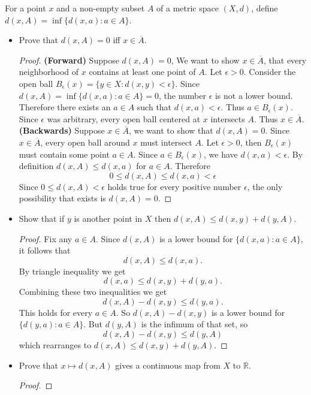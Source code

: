 \documentclass[minion]{homework}
\newcommand{\Reals}{\ensuremath{\mathbb R}}%
\begin{document}
\begin{problems}
For a point $x$ and a non-empty subset $A$ of a metric space $(X, d)$, define $d(x, A) = \inf\{d(x, a) : a \in A\}$.
\begin{itemize}
  \item[(a)] Prove that $d(x, A) = 0$ iff $x \in \overline{A}$. \newline
    \begin{proof}\textbf{(Forward)}
      Suppose $d(x,A) = 0$, We want to show $x \in \overline{A}$, that every neighborhood of $x$ contains at least one point of $A$.
      Let $\epsilon > 0$. Consider the open ball $B_\epsilon(x) = \{y \in X : d(x,y) < \epsilon\}.$ Since $d(x,A) = \inf\{d(x,a): a \in A\} = 0$, the number $\epsilon$ is not a lower bound. Therefore there exists an $a \in A$ such that $d(x,a) < \epsilon$. Thus $ a \in B_\epsilon(x)$. Since $\epsilon$ was arbitrary, every open ball centered at $x$ intersects $A$. Thus $x \in \overline{A}$.
      \newline \textbf{(Backwards)} Suppose $x \in \overline{A}$, we want to show that $d(x,A) = 0.$ Since $x \in \overline{A}$, every open ball around $x$ must intersect $A$. Let $\epsilon > 0$, then  $B_\epsilon(x)$ must contain some point $a \in A$. Since $a \in B_\epsilon(x)$, we have $d(x,a) < \epsilon.$ By definition $d(x,A) \leq d(x,a)$ for $a \in A$. Therefore
      $$0 \leq d(x,A) \leq d(x,a) < \epsilon$$
      Since $0 \leq d(x,A) < \epsilon$ holds true for every positive number $\epsilon$, the only possibility that exists is $d(x,A) = 0.$
    \end{proof}
  \item[(b)] Show that if $y$ is another point in $X$ then $d(x, A) \le d(x, y) + d(y, A)$. \newline
    \begin{proof}
      Fix any $a \in A$. Since $d(x,A)$ is a lower bound for $\{d(x,a) : a \in A\}$, it follows that
      $$d(x,A) \leq d(x,a).$$
      By triangle inequality we get
      $$d(x,a) \leq d(x,y) + d(y,a).$$
      Combining these two inequalities we get
      $$d(x,A) - d(x,y) \leq d(y,a).$$
      This holds for every $a \in A$. So $d(x,A) - d(x,y)$ is a lower bound for $\{d(y,a) : a \in A\}$.
      But $d(y,A)$ is the infimum of that set, so
      $$d(x,A) - d(x,y) \leq d(y,A)$$
      which rearranges to $d(x,A) \leq d(x,y) + d(y,A)$.
    \end{proof}
  \item[(c)] Prove that $x \mapsto d(x, A)$ gives a continuous map from $X$ to $\Reals$. \newline
    \begin{proof}

\end{proof}
\end{itemize}
\end{problems}
\end{document}
